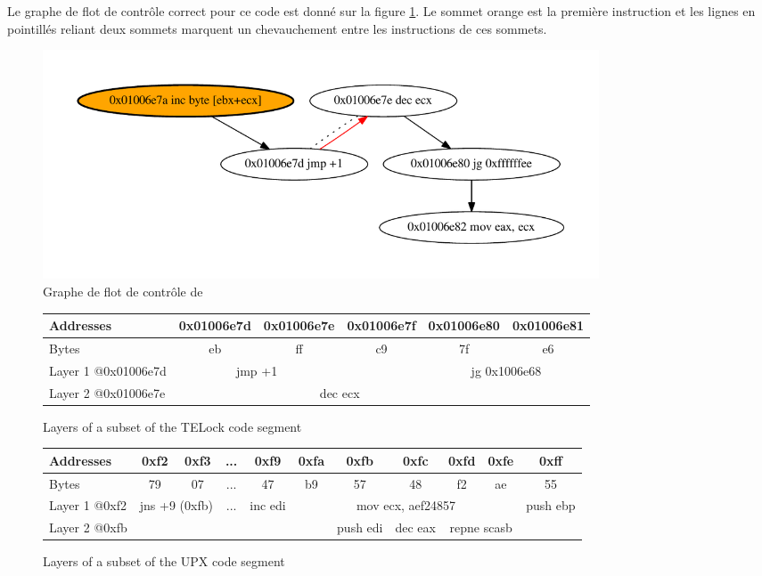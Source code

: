 Le graphe de flot de contrôle correct pour ce code est donné sur la figure \ref{fig:telock_cfg}. Le sommet orange est la première instruction et les lignes en pointillés reliant deux sommets marquent un chevauchement entre les instructions de ces sommets.

\begin{figure}
\begin{center}
\includegraphics[width=0.8\textwidth]{supports/disasm/telock/telock.pdf}
\end{center}
\caption{Graphe de flot de contrôle de \telock}
\label{fig:telock_cfg}
\end{figure}

\begin{figure}
\begin{center}
\begin{tabular}{|l|c|c|c|c|c|}
\hline
Addresses & 0x01006e7d & 0x01006e7e & 0x01006e7f & 0x01006e80 & 0x01006e81\\
\hline
Bytes & eb & ff & c9 & 7f & e6\\
\hline
Layer 1 @0x01006e7d & \multicolumn{2}{c|}{jmp +1} & \cellcolor[gray]{0.0} & \multicolumn{2}{c|}{jg 0x1006e68}\\
\hline
Layer 2 @0x01006e7e & \cellcolor[gray]{0.0} & \multicolumn{2}{c|}{dec ecx} & \multicolumn{2}{c|}{\cellcolor[gray]{0.0}} \\
 \hline
\end{tabular}
\end{center}
\caption{Layers of a subset of the TELock code segment}
\label{fig:telock-layers-recursive}
\end{figure}

\begin{figure}
\begin{center}
\begin{tabular}{|l|c|c|c|c|c|c|c|c|c|c|}
\hline
Addresses & 0xf2 & 0xf3 & ... & 0xf9 & 0xfa & 0xfb & 0xfc & 0xfd & 0xfe & 0xff\\
\hline
Bytes & 79 & 07 & ... & 47 & b9 & 57 & 48 & f2 & ae & 55\\
\hline
Layer 1 @0xf2 & \multicolumn{2}{c|}{jns +9 (0xfb)} & ... & inc edi & \multicolumn{5}{c|}{mov ecx, aef24857} & push ebp\\
\hline
Layer 2 @0xfb & \multicolumn{5}{c|}{\cellcolor[gray]{0.0}} & push edi & dec eax & \multicolumn{2}{c|}{repne scasb} & \cellcolor[gray]{0.0}\\
\hline
\end{tabular}
\end{center}
\caption{Layers of a subset of the UPX code segment}
\label{fig:upx-layers-recursive}
\end{figure}

